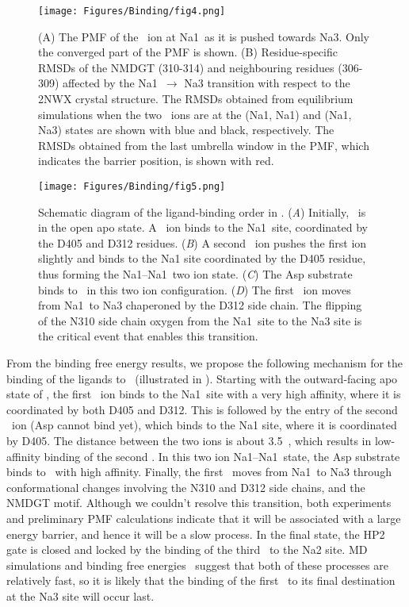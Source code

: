 \begin{figure}[t!]
\centering
\texttt{[image: Figures/Binding/fig4.png]}
\caption{(A) The PMF of the \Na\ ion at Na1\prim\ as it is pushed towards Na3. 
Only the converged part of the PMF is shown. (B) Residue-specific RMSDs of the 
NMDGT (310-314) and neighbouring residues (306-309) affected by the Na1\prim\ 
$\rightarrow$ Na3 transition with respect to the 2NWX crystal structure. The 
RMSDs obtained from equilibrium simulations when the two \Na\ ions are at the 
(Na1, Na1\prim) and (Na1, Na3) states are shown with blue and black, respectively. 
The RMSDs obtained from the last umbrella window in the PMF, which indicates the 
barrier position, is shown with red.}
\label{bind:fig4}
\end{figure}

\begin{figure}[t!]
\centering
\texttt{[image: Figures/Binding/fig5.png]}
\caption{Schematic diagram of the ligand-binding order in \GltPh. 
(\textit{A}) Initially, \GltPh\ is in the open apo state. A \Na\ ion binds to the Na1\prim\ site, 
coordinated by the D405 and D312 residues. 
(\textit{B}) A second \Na\ ion pushes the first ion slightly and binds to the Na1 site coordinated by 
the D405 residue, thus forming the Na1--Na1\prim\ two ion state. 
(\textit{C}) The Asp substrate binds to \GltPh\ in this two ion configuration. 
(\textit{D}) The first \Na\ ion moves from Na1\prim\ to Na3 chaperoned by the D312 side chain. 
The flipping of the N310 side chain oxygen from the Na1\prim\ site to the Na3 site is the critical event
that enables this transition.}
\label{bind:fig5}
\end{figure}

From the binding free energy results, we propose the following mechanism for the binding of the ligands 
to \GltPh\ (illustrated in \figref{bind:fig5}). Starting with the outward-facing apo state of \GltPh, 
the first \Na\ ion binds to the Na1\prim\ site with a very high affinity, where it is coordinated by 
both D405 and D312. This is followed by the entry of the second \Na\ ion (Asp cannot bind yet), which 
binds to the Na1 site, where it is coordinated by D405. The distance between the two ions is about 
3.5~\angs, which results in low-affinity binding of the second \Na. In this two ion Na1--Na1\prim\ 
state, the Asp substrate binds to \GltPh\ with high affinity. Finally, the first \Na\ moves from 
Na1\prim\ to Na3 through conformational changes involving the N310 and D312 side chains, and the NMDGT 
motif. Although we couldn't resolve this transition, both experiments~\cite{Reyes2013b,Hanelt2015} 
and preliminary PMF calculations indicate that it will be associated with a large energy barrier, and 
hence it will be a slow process. In the final state, the HP2 gate is closed and locked by the binding
of the third \Na\ to the Na2 site. MD simulations and binding free 
energies~\cite{Ryan2009,Grazioso2012,Setiadi2017} suggest that both of these processes are relatively 
fast, so it is likely that the binding of the first \Na\ to its final destination at the Na3 site will 
occur last.

